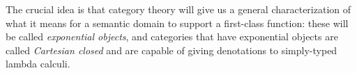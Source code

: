 The crucial idea is that category theory will give us a general characterization 
of what it means for a semantic domain to support a first-class function: 
these will be called \emph{exponential objects}, and categories that have 
exponential objects are called \emph{Cartesian closed}
and are capable of giving denotations to simply-typed lambda calculi.





